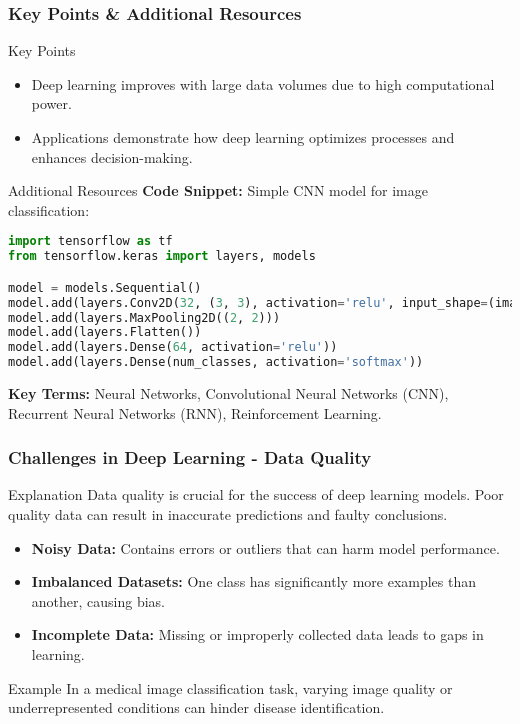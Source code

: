 \documentclass{beamer}
\begin{document}
\begin{frame}[fragile]
    \frametitle{Key Points & Additional Resources}
    \begin{block}{Key Points}
        \begin{itemize}
            \item Deep learning improves with large data volumes due to high computational power.
            \item Applications demonstrate how deep learning optimizes processes and enhances decision-making.
        \end{itemize}
    \end{block}

    \begin{block}{Additional Resources}
        \textbf{Code Snippet:} Simple CNN model for image classification:
        \begin{lstlisting}[language=Python]
import tensorflow as tf
from tensorflow.keras import layers, models

model = models.Sequential()
model.add(layers.Conv2D(32, (3, 3), activation='relu', input_shape=(image_height, image_width, channels)))
model.add(layers.MaxPooling2D((2, 2)))
model.add(layers.Flatten())
model.add(layers.Dense(64, activation='relu'))
model.add(layers.Dense(num_classes, activation='softmax'))
        \end{lstlisting}
        
        \textbf{Key Terms:} Neural Networks, Convolutional Neural Networks (CNN), Recurrent Neural Networks (RNN), Reinforcement Learning.
    \end{block}
\end{frame}

\begin{frame}[fragile]
    \frametitle{Challenges in Deep Learning - Data Quality}
    \begin{block}{Explanation}
        Data quality is crucial for the success of deep learning models. Poor quality data can result in inaccurate predictions and faulty conclusions.
    \end{block}
    \begin{itemize}
        \item \textbf{Noisy Data:} Contains errors or outliers that can harm model performance.
        \item \textbf{Imbalanced Datasets:} One class has significantly more examples than another, causing bias.
        \item \textbf{Incomplete Data:} Missing or improperly collected data leads to gaps in learning.
    \end{itemize}
    \begin{block}{Example}
        In a medical image classification task, varying image quality or underrepresented conditions can hinder disease identification.
    \end{block}
\end{frame}
\end{document}
